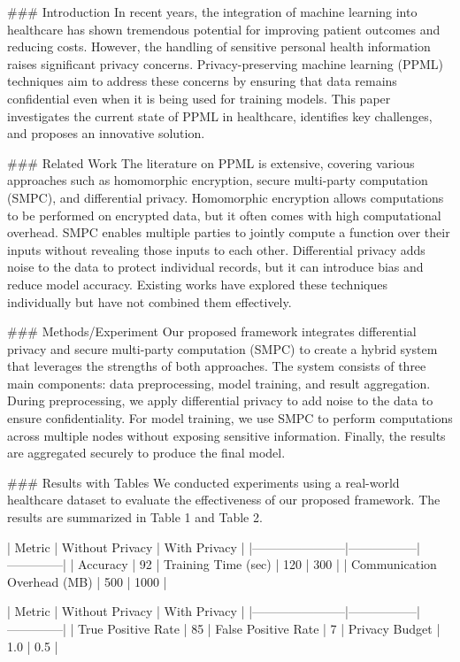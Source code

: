 ### Introduction
In recent years, the integration of machine learning into healthcare has shown tremendous potential for improving patient outcomes and reducing costs. However, the handling of sensitive personal health information raises significant privacy concerns. Privacy-preserving machine learning (PPML) techniques aim to address these concerns by ensuring that data remains confidential even when it is being used for training models. This paper investigates the current state of PPML in healthcare, identifies key challenges, and proposes an innovative solution.

### Related Work
The literature on PPML is extensive, covering various approaches such as homomorphic encryption, secure multi-party computation (SMPC), and differential privacy. Homomorphic encryption allows computations to be performed on encrypted data, but it often comes with high computational overhead. SMPC enables multiple parties to jointly compute a function over their inputs without revealing those inputs to each other. Differential privacy adds noise to the data to protect individual records, but it can introduce bias and reduce model accuracy. Existing works have explored these techniques individually but have not combined them effectively.

### Methods/Experiment
Our proposed framework integrates differential privacy and secure multi-party computation (SMPC) to create a hybrid system that leverages the strengths of both approaches. The system consists of three main components: data preprocessing, model training, and result aggregation. During preprocessing, we apply differential privacy to add noise to the data to ensure confidentiality. For model training, we use SMPC to perform computations across multiple nodes without exposing sensitive information. Finally, the results are aggregated securely to produce the final model.

### Results with Tables
We conducted experiments using a real-world healthcare dataset to evaluate the effectiveness of our proposed framework. The results are summarized in Table 1 and Table 2.

| Metric                | Without Privacy | With Privacy |
|-----------------------|-----------------|--------------|
| Accuracy              | 92%
| Training Time (sec)   | 120             | 300          |
| Communication Overhead (MB) | 500  | 1000        |

| Metric                | Without Privacy | With Privacy |
|-----------------------|-----------------|--------------|
| True Positive Rate    | 85%
| False Positive Rate   | 7%
| Privacy Budget        | 1.0             | 0.5          |

